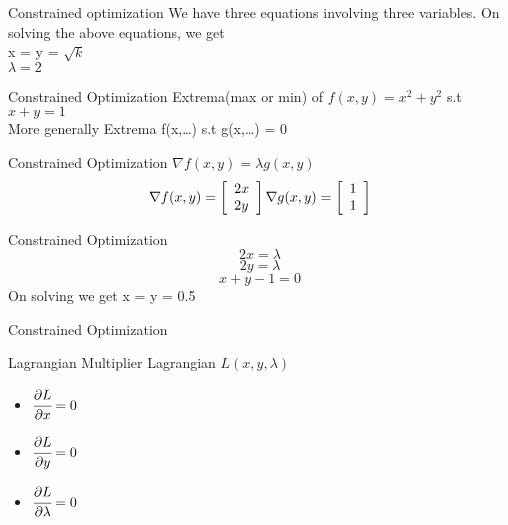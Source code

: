 \documentclass{beamer}
\begin{document}
\begin{frame}{Constrained optimization}
    We have three equations involving three variables. 
    On solving the above equations, we get\\
    x = y = $\sqrt{k}$\\
    $\lambda = 2$\\
\end{frame}

\begin{frame}{Constrained Optimization}
    Extrema(max or min) of $f(x,y) = x^{2} + y^{2}$ s.t $x + y = 1$\\
    
    \vspace{5em}
    More generally Extrema f(x,\dots) s.t g(x,\dots) = 0
\end{frame}

\begin{frame}{Constrained Optimization}
    $\nabla f(x,y) = \lambda g(x,y)$ \\
    \vspace{1em}
    $$
   \nabla f(x, y)=\left[\begin{array}{l}
   	{2 x} \\
   	{2 y}
   \end{array}\right] 
    \vspace{1em} 
    \nabla g(x, y)=\left[\begin{array}{l}
    	{1} \\
    	{1}
    \end{array}\right]
    $$
\end{frame}

\begin{frame}{Constrained Optimization}
    \begin{equation}
        2x=\lambda
    \end{equation}
    \begin{equation}
        2y=\lambda
    \end{equation}
    \begin{equation}
        x + y - 1 = 0
    \end{equation}
    On solving we get x = y = 0.5
\end{frame}

\begin{frame}{Constrained Optimization}

\end{frame}

\begin{frame}{Lagrangian Multiplier}
    Lagrangian $L(x,y,\lambda)$
    \begin{itemize}
        \item $\cfrac{\partial L}{\partial x} = 0$
        \item $\cfrac{\partial L}{\partial y} = 0$
        \item $\cfrac{\partial L}{\partial \lambda} = 0$
    \end{itemize}
    
\end{frame}
\end{document}
